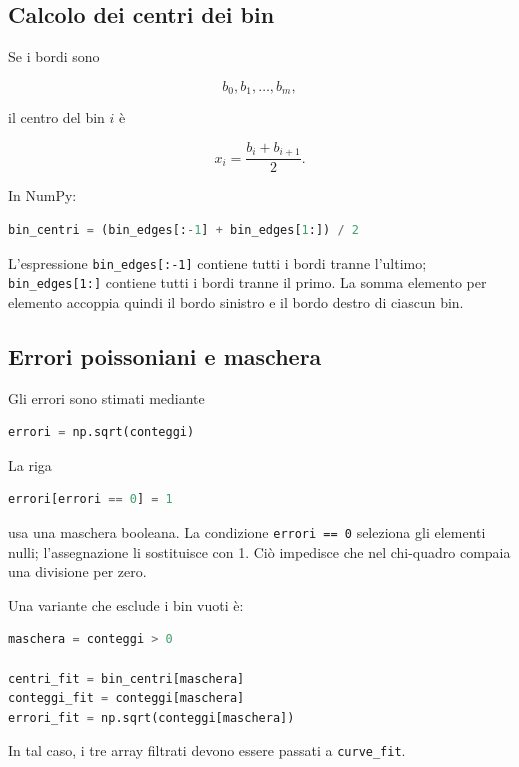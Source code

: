 \documentclass[11pt,a4paper]{book}
\begin{document}
\subsection{Calcolo dei centri dei bin}

Se i bordi sono

\[
b_0,b_1,\ldots,b_m,
\]

il centro del bin $i$ è

\[
x_i=\frac{b_i+b_{i+1}}{2}.
\]

In NumPy:

\begin{lstlisting}[language=Python]
bin_centri = (bin_edges[:-1] + bin_edges[1:]) / 2
\end{lstlisting}

L'espressione \texttt{bin\_edges[:-1]} contiene tutti i bordi tranne
l'ultimo; \texttt{bin\_edges[1:]} contiene tutti i bordi tranne il primo.
La somma elemento per elemento accoppia quindi il bordo sinistro e il
bordo destro di ciascun bin.

\subsection{Errori poissoniani e maschera}

Gli errori sono stimati mediante

\begin{lstlisting}[language=Python]
errori = np.sqrt(conteggi)
\end{lstlisting}

La riga

\begin{lstlisting}[language=Python]
errori[errori == 0] = 1
\end{lstlisting}

usa una maschera booleana. La condizione \texttt{errori == 0} seleziona
gli elementi nulli; l'assegnazione li sostituisce con 1. Ciò impedisce
che nel chi-quadro compaia una divisione per zero.

Una variante che esclude i bin vuoti è:

\begin{lstlisting}[language=Python]
maschera = conteggi > 0

centri_fit = bin_centri[maschera]
conteggi_fit = conteggi[maschera]
errori_fit = np.sqrt(conteggi[maschera])
\end{lstlisting}

In tal caso, i tre array filtrati devono essere passati a
\texttt{curve\_fit}.
\end{document}
